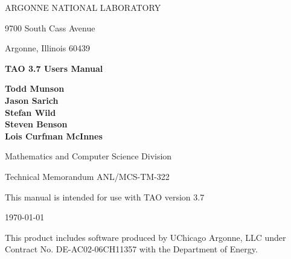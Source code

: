 
\vspace{1.75in}

\begin{center}

ARGONNE NATIONAL LABORATORY

9700 South Cass Avenue

Argonne, Illinois  60439

\vspace{1.5in}

{\Large
{\bf 
TAO 3.7 Users Manual
}
}

\vspace{.5in}

{\bf Todd Munson \\ Jason Sarich \\ Stefan Wild \\ Steven Benson \\ Lois Curfman McInnes}

\vspace{.5in}

Mathematics and Computer Science Division

\vspace{.25in}

Technical Memorandum ANL/MCS-TM-322

\vspace{.25in}

This manual is intended for use with TAO version 3.7

\vspace{1.0in}

\today
\end{center}

\vspace{0.75in}

\par\noindent
This product includes software produced by UChicago Argonne, LLC under 
Contract No. DE-AC02-06CH11357 with the Department of Energy.
